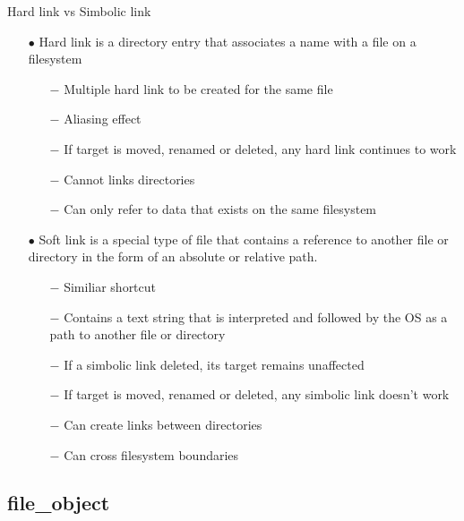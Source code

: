 \documentclass{beamer}
\begin{document}
\begin{frame}{Hard link vs Simbolic link}
	\begin{itemize}[<+->]
		\item[$\bullet$]{Hard link is a directory entry that associates a name with a file on a filesystem}
			\begin{itemize}
				\item[$-$]{Multiple hard link to be created for the same file}
				\item[$-$]{Aliasing effect}
				\item[$-$]{If target is moved, renamed or deleted, any hard link continues to work}
				\item[$-$]{Cannot links directories}
				\item[$-$]{Can only refer to data that exists on the same filesystem}
			\end{itemize}

		\item[$\bullet$]{Soft link is a special type of file that contains a reference to another file or directory in the form of an absolute or relative path.}
			\begin{itemize}
				\item[$-$]{Similiar shortcut}
				\item[$-$]{Contains a text string that is interpreted and followed by the OS as a path to another file or directory}
				\item[$-$]{If a simbolic link deleted, its target remains unaffected}
				\item[$-$]{If target is moved, renamed or deleted, any simbolic link doesn't work}
				\item[$-$]{Can create links between directories}
				\item[$-$]{Can cross filesystem boundaries}
			\end{itemize}

	\end{itemize}
\end{frame}


\subsection{file\_object}
\end{document}
